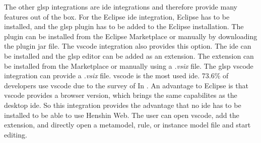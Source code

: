   The other \ac{glsp} integrations are \acs{ide} integrations and therefore provide many features out of the box. For the Eclipse \acs{ide} integration, Eclipse has to be installed, and the \ac{glsp} plugin has to be added to the Eclipse installation. The plugin can be installed from the Eclipse Marketplace or manually by downloading the plugin jar file. \cite{eclipse-doc} The \ac{vscode} integration also provides this option. The \acs{ide} can be installed and the \ac{glsp} editor can be added as an extension. The extension can be installed from the Marketplace or manually using a \textit{.vsix} file. \cite{vscode-doc} The \ac{glsp} \ac{vscode} integration can provide a \textit{.vsix} file. \cite{glsp-repo} \ac{vscode} is the most used \acs{ide}. 73.6\% of developers use \ac{vscode} due to the survey of \citeauthor{stackoverflow2024survey} In \citeyear{stackoverflow2024survey} \cite{stackoverflow2024survey}. An advantage to Eclipse is that \ac{vscode} provides a browser version, which brings the same capabilites as the desktop \acs{ide}. \cite{vscode-doc} So this integration provides the advantage that no \acs{ide} has to be installed to be able to use Henshin Web. The user can open \ac{vscode}, add the extension, and directly open a metamodel, rule, or instance model file and start editing. 

